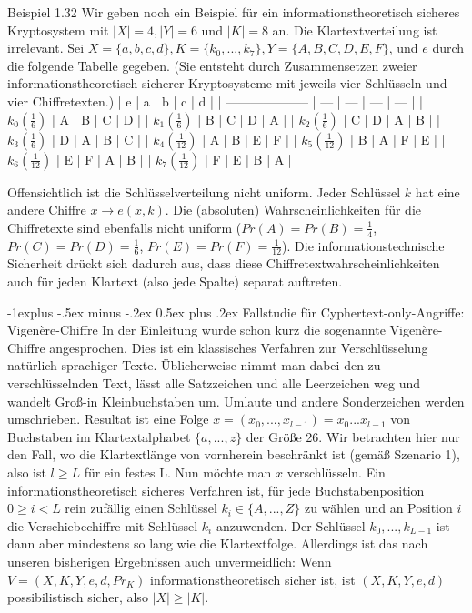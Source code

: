 \documentclass[a4paper]{article}
\makeatletter
\renewcommand{\subsection}{\@startsection{subsection}{2}{0mm}%
 {-1explus -.5ex minus -.2ex}%
 {0.5ex plus .2ex}%
 {\normalfont\normalsize\bfseries}}
\makeatother
\begin{document}
\begin{multicols}{3}
    Beispiel 1.32 Wir geben noch ein Beispiel für ein informationstheoretisch sicheres Kryptosystem mit $|X|=4,|Y|=6$ und $|K|=8$ an. Die Klartextverteilung ist irrelevant. Sei $X=\{a,b,c,d\},K=\{k_0,...,k_7\},Y=\{A,B,C,D,E,F\}$, und $e$ durch die folgende Tabelle gegeben. (Sie entsteht durch Zusammensetzen zweier informationstheoretisch sicherer Kryptosysteme mit jeweils vier Schlüsseln und vier Chiffretexten.)
    | e                    | a   | b   | c   | d   |
    | -------------------- | --- | --- | --- | --- |
    | $k_0 (\frac{1}{6})$  | A   | B   | C   | D   |
    | $k_1 (\frac{1}{6})$  | B   | C   | D   | A   |
    | $k_2 (\frac{1}{6})$  | C   | D   | A   | B   |
    | $k_3 (\frac{1}{6})$  | D   | A   | B   | C   |
    | $k_4 (\frac{1}{12})$ | A   | B   | E   | F   |
    | $k_5 (\frac{1}{12})$ | B   | A   | F   | E   |
    | $k_6 (\frac{1}{12})$ | E   | F   | A   | B   |
    | $k_7 (\frac{1}{12})$ | F   | E   | B   | A   |

    Offensichtlich ist die Schlüsselverteilung nicht uniform. Jeder Schlüssel $k$ hat eine andere Chiffre $x\rightarrow e(x,k)$. Die (absoluten) Wahrscheinlichkeiten für die Chiffretexte sind ebenfalls nicht uniform ($Pr(A)=Pr(B)=\frac{1}{4}$, $Pr(C)=Pr(D)=\frac{1}{6}$, $Pr(E)=Pr(F)=\frac{1}{12}$).
    Die informationstechnische Sicherheit drückt sich dadurch aus, dass diese Chiffretextwahrscheinlichkeiten auch für jeden Klartext (also jede Spalte) separat auftreten.

    \subsection{Fallstudie für Cyphertext-only-Angriffe: Vigenère-Chiffre}
    In der Einleitung wurde schon kurz die sogenannte Vigenère-Chiffre angesprochen. Dies ist ein klassisches Verfahren zur Verschlüsselung natürlich sprachiger Texte. Üblicherweise nimmt man dabei den zu verschlüsselnden Text, lässt alle Satzzeichen und alle Leerzeichen weg und wandelt Groß-in Kleinbuchstaben um. Umlaute und andere Sonderzeichen werden umschrieben. Resultat ist eine Folge $x=(x_0,...,x_{l-1})=x_0 ...x_{l-1}$ von Buchstaben im Klartextalphabet $\{a,...,z\}$ der Größe 26. Wir betrachten hier nur den Fall, wo die Klartextlänge von vornherein beschränkt ist (gemäß Szenario 1), also ist $l\geq L$ für ein festes L. Nun möchte man $x$ verschlüsseln. Ein informationstheoretisch sicheres Verfahren ist, für jede Buchstabenposition $0\geq i < L$ rein zufällig einen Schlüssel $k_i\in\{A,...,Z\}$ zu wählen und an Position $i$ die Verschiebechiffre mit Schlüssel $k_i$ anzuwenden. Der Schlüssel $k_0,...,k_{L-1}$ ist dann aber mindestens so lang wie die Klartextfolge. Allerdings ist das nach unseren bisherigen Ergebnissen auch unvermeidlich: Wenn $V=(X,K,Y,e,d,Pr_K)$ informationstheoretisch sicher ist, ist $(X,K,Y,e,d)$ possibilistisch sicher, also $|X|\geq |K|$.


\end{multicols}
\end{document}
